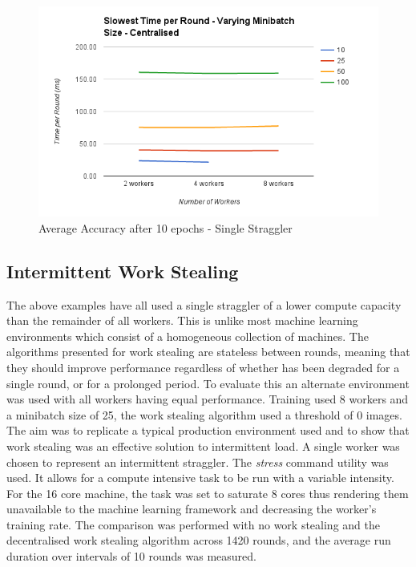 \documentclass[12pt]{article}
\begin{document}
\begin{figure}[H]
  \centering
  \includegraphics[width=6in]{SlowestMinibatchCentralised}
  \caption[]{Average Accuracy after 10 epochs - Single Straggler}
  \label{SlowestMinibatchCentralised}
\end{figure}

\subsection{Intermittent Work Stealing}

The above examples have all used a single straggler of a lower compute capacity than the remainder of all workers. This is unlike most machine learning environments which consist of a homogeneous collection of machines. The algorithms presented for work stealing are stateless between rounds, meaning that they should improve performance regardless of whether has been degraded for a single round, or for a prolonged period.
\newline
\newline
To evaluate this an alternate environment was used with all workers having equal performance. Training used 8 workers and a minibatch size of 25, the work stealing algorithm used a threshold of 0 images. The aim was to replicate a typical production environment used and to show that work stealing was an effective solution to intermittent load. A single worker was chosen to represent an intermittent straggler. The \textit{stress} command utility was used. It allows for a compute intensive task to be run with a variable intensity. For the 16 core machine, the task was set to saturate 8 cores thus rendering them unavailable to the machine learning framework and decreasing the worker's training rate. The comparison was performed with no work stealing and the decentralised work stealing algorithm across 1420 rounds, and the average run duration over intervals of 10 rounds was measured.
\end{document}
